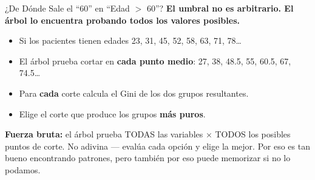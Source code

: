 \documentclass[aspectratio=169, 11pt]{beamer}
\begin{document}
\begin{frame}{¿De Dónde Sale el ``60'' en ``Edad $>$ 60''?}
  \vspace{-4pt}
  {\footnotesize\color{arcaDark}\bfseries
    El umbral \textbf{no es arbitrario}. El árbol lo encuentra
    probando todos los valores posibles.}

  \vspace{6pt}
  {\footnotesize
  \begin{itemize}\setlength{\itemsep}{5pt}
    \item[{\color{arcaRed}\scriptsize\faArrowRight}]
      Si los pacientes tienen edades 23, 31, 45, 52, 58, 63, 71, 78\ldots
    \item[{\color{arcaRed}\scriptsize\faArrowRight}]
      El árbol prueba cortar en \textbf{cada punto medio}:
      27, 38, 48.5, 55, 60.5, 67, 74.5\ldots
    \item[{\color{arcaRed}\scriptsize\faArrowRight}]
      Para \textbf{cada} corte calcula el Gini de los dos grupos resultantes.
    \item[{\color{arcaRed}\scriptsize\faArrowRight}]
      Elige el corte que produce los grupos \textbf{más puros}.
  \end{itemize}
  }

  \vspace{6pt}
  \begin{tcolorbox}[colback=arcaGray, colframe=arcaRed, boxrule=0.5pt, arc=2pt,
    left=6pt, right=6pt, top=4pt, bottom=4pt]
    {\scriptsize\color{arcaDark}
    \faKey\hspace{4pt}\textbf{Fuerza bruta:} el árbol prueba TODAS las
    variables × TODOS los posibles puntos de corte. No adivina ---
    evalúa cada opción y elige la mejor. Por eso es tan bueno encontrando
    patrones, pero también por eso puede memorizar si no lo podamos.}
  \end{tcolorbox}
\end{frame}
\end{document}
